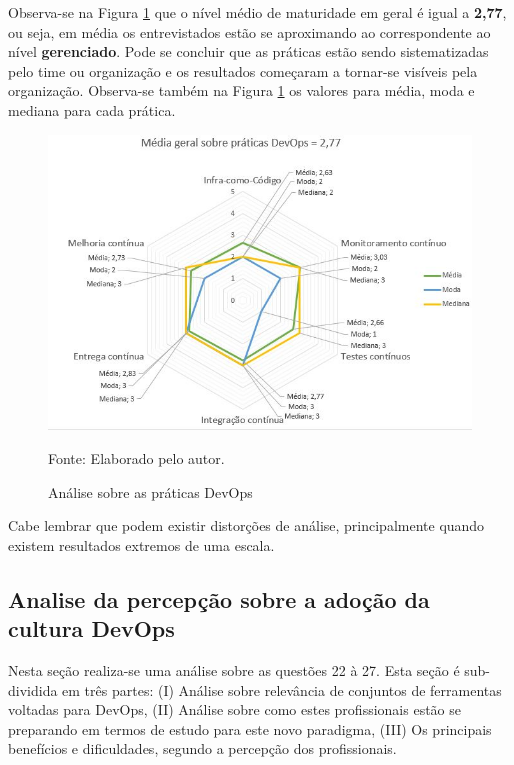 \documentclass[twoside,english,brazilian]{UNISINOSartigo}
\newcommand{\source}[1]{\caption*{Fonte: {#1}} }
\begin{document}
Observa-se na Figura \ref{fig:pratDevOps} que o nível médio de maturidade em geral é igual a \textbf{2,77}, ou seja, em média os entrevistados estão se aproximando ao correspondente ao nível \textbf{gerenciado}. Pode se concluir que as práticas estão sendo sistematizadas pelo time ou organização e os resultados começaram a tornar-se visíveis pela organização. Observa-se também na Figura \ref{fig:pratDevOps} os valores para média, moda e mediana para cada prática. 
\begin{figure}[H]
    \centering
    \caption{Análise sobre as práticas DevOps}
       \includegraphics[scale=.6]{imagens/maturidade_radar.JPG}
        \source{Elaborado pelo autor.}
    \label{fig:pratDevOps}
\end{figure}

Cabe lembrar que podem existir distorções de análise, principalmente quando existem resultados extremos de uma escala.

\subsection{Analise da percepção sobre a adoção da cultura DevOps}

Nesta seção realiza-se uma análise sobre as questões 22 à 27. Esta seção é sub-dividida em três partes: (I) Análise sobre relevância de conjuntos de ferramentas voltadas para DevOps, (II) Análise sobre como estes profissionais estão se preparando em termos de estudo para este novo paradigma, (III) Os principais benefícios e dificuldades, segundo a percepção dos profissionais.
\end{document}
